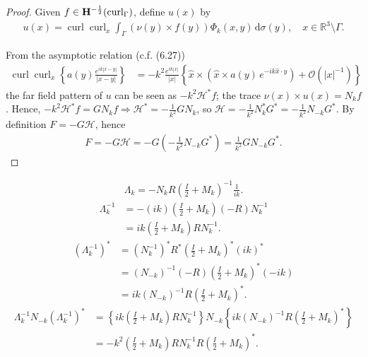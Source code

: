 \documentclass[a4paper,12pt]{article}
\theoremstyle{definition}
\newcommand\bdr{\Gamma}
\newcommand\Curl{\curl_\bdr}
\newcommand\Hhm{{\bf H}^{-\frac{1}{2}}}
\newcommand\lTC{\Hhm(\Curl)}
\newcommand\ints[2][y]{\int_{\bdr}#2\,\text{d}\sigma(#1)}
\DeclareMathOperator\curl{curl}
\begin{document}
\begin{proof}
  Given $f\in\lTC$, define $u(x)$ by
  \begin{align*}
    u(x) = \curl\curl_x\ints{\left(\nu(y)\times f(y)\right)\Phi_k(x,y)},\quad x\in\mathbb{R}^3\setminus\bdr.
  \end{align*}
  
  From the asymptotic relation (c.f. \citet{colton13} (6.27))
  \begin{align*}
    \curl\curl_x\left\{a(y)\frac{e^{ik|x-y|}}{|x-y|}\right\} &= -k^2\frac{e^{ik|x|}}{|x|}\left\{\hat{x}\times\left(\hat{x}\times a(y)\,e^{-ik\hat{x}\cdot y}\right)+ \mathcal{O}\left(|x|^{-1}\right)\right\} 
  \end{align*}
  the far field pattern of $u$ can be seen as $-k^2\mathcal{H}^*f$; the trace $\nu(x)\times u(x) = N_k f$. Hence, $-k^2\mathcal{H}^*f = G N_k f\Longrightarrow\mathcal{H}^* = -\frac{1}{k^2} G N_k$, so $\mathcal{H} = -\frac{1}{k^2} N_k^* G^* = -\frac{1}{k^2}N_{-k}G^*$. By definition $F=-G\mathcal{H}$, hence 
  \begin{align}
    F = -G\mathcal{H} = -G\left(-\frac{1}{k^2}N_{-k}G^*\right)= \frac{1}{k^2}GN_{-k}G^*.
  \end{align}
\end{proof}


\begin{align}
  \Lambda_k = -N_kR\left(\frac{I}{2}+M_k\right)^{-1}\frac{1}{ik}.
\end{align}
\begin{align}
  \Lambda_k^{-1} &= -\left(ik\right)\left(\frac{I}{2}+M_k\right)\left(-R\right)N_k^{-1}\nonumber \\
  &= ik\left(\frac{I}{2}+M_k\right)RN_k^{-1}.
\end{align}
\begin{align}
  \left(\Lambda_k^{-1}\right)^* &= \left(N_k^{-1}\right)^*R^*\left(\frac{I}{2}+M_k\right)^*\left(ik\right)^*\nonumber \\
   &=\left(N_{-k}\right)^{-1}(-R)\left(\frac{I}{2}+M_k\right)^*(-ik)\nonumber\\
   &= ik\left(N_{-k}\right)^{-1}R\left(\frac{I}{2}+M_k\right)^*.
\end{align}
\begin{align}
  \Lambda_k^{-1}N_{-k}\left(\Lambda_k^{-1}\right)^* &= \left\{ik\left(\frac{I}{2}+M_k\right)RN_k^{-1}\right\}N_{-k}\left\{ik\left(N_{-k}\right)^{-1}R\left(\frac{I}{2}+M_k\right)^*\right\}\nonumber \\
  &=-k^2\left(\frac{I}{2}+M_k\right)RN_k^{-1}R\left(\frac{I}{2}+M_k\right)^*.
\end{align}
\end{document}
